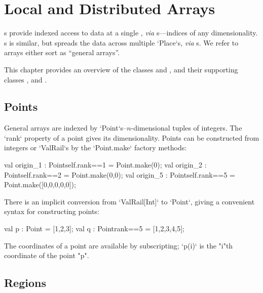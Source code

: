 \chapter{Local and Distributed Arrays}\label{XtenArrays}

s provide indexed access to data at a single , {\em via}
s---indices of any dimensionality. s is similar, but
spreads the data across multiple \xcd`Place`s, {\em via} s.  
We refer to arrays either sort as ``general arrays''.  


This chapter provides an overview of the  classes 
and , and their supporting classes , 
and .  



\section{Points}\label{point-syntax}

General arrays are indexed by \xcd`Point`s--$n$-dimensional tuples of
integers.  The \xcd`rank`
property of a point gives its dimensionality.  Points can be constructed from
integers or \xcd`ValRail`s by
the \xcd`Point.make` factory methods:
\begin{xten}
val origin_1 : Point{self.rank==1} = Point.make(0);
val origin_2 : Point{self.rank==2} = Point.make(0,0);
val origin_5 : Point{self.rank==5} = Point.make([0,0,0,0,0]);
\end{xten}

There is an implicit conversion from \xcd`ValRail[Int]` to \xcd`Point`, giving
a convenient syntax for constructing points: 

\begin{xten}
val p : Point = [1,2,3];
val q : Point{rank==5} = [1,2,3,4,5];
\end{xten}

The coordinates of a point are available by subscripting; \xcd`p(i)` is the
\xcd"i"th coordinate of the point \xcd"p".

\section{Regions}\label{XtenRegions}

